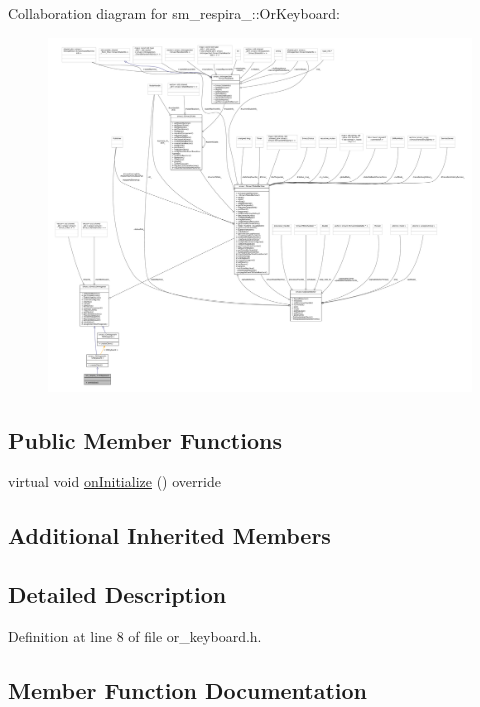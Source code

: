 Collaboration diagram for sm\+\_\+respira\+\_\+:\+:Or\+Keyboard\+:
\nopagebreak
\begin{figure}[H]
\begin{center}
\leavevmode
\includegraphics[width=350pt]{classsm__respira__1_1_1OrKeyboard__coll__graph}
\end{center}
\end{figure}
\subsection*{Public Member Functions}
\begin{DoxyCompactItemize}
\item 
virtual void \hyperlink{classsm__respira__1_1_1OrKeyboard_a621b08a13f8165f7e17aacaf1fb9e29a}{on\+Initialize} () override
\end{DoxyCompactItemize}
\subsection*{Additional Inherited Members}


\subsection{Detailed Description}


Definition at line 8 of file or\+\_\+keyboard.\+h.



\subsection{Member Function Documentation}
